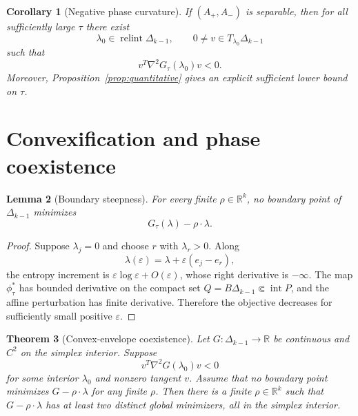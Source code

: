 \documentclass[11pt]{article}
\theoremstyle{plain}
\newtheorem{theorem}{Theorem}[section]
\newtheorem{lemma}[theorem]{Lemma}
\newtheorem{corollary}[theorem]{Corollary}
\theoremstyle{definition}
\theoremstyle{remark}
\newcommand{\R}{\mathbb R}
\newcommand{\relint}{\operatorname{relint}}
\newcommand{\DeltaK}{\Delta_{k-1}}
\begin{document}
\begin{corollary}[Negative phase curvature]\label{cor:negative-curvature}
If $(A_+,A_-)$ is separable, then for all sufficiently large $\tau$ there exist
\[
 \lambda_0\in\relint\DeltaK,
 \qquad
 0\ne v\in T_{\lambda_0}\DeltaK
\]
such that
\[
 v^T\nabla^2G_\tau(\lambda_0)v<0.
\]
Moreover, Proposition~\ref{prop:quantitative} gives an explicit sufficient lower bound on $\tau$.
\end{corollary}

\section{Convexification and phase coexistence}

\begin{lemma}[Boundary steepness]\label{lem:boundary}
For every finite $\rho\in\R^k$, no boundary point of $\DeltaK$ minimizes
\[
 G_\tau(\lambda)-\rho\cdot\lambda.
\]
\end{lemma}

\begin{proof}
Suppose $\lambda_j=0$ and choose $r$ with $\lambda_r>0$. Along
\[
 \lambda(\varepsilon)=\lambda+\varepsilon(e_j-e_r),
\]
the entropy increment is $\varepsilon\log\varepsilon+O(\varepsilon)$, whose right derivative is $-\infty$. The map $\phi_\tau^*$ has bounded derivative on the compact set $Q=B\DeltaK\Subset\operatorname{int}P$, and the affine perturbation has finite derivative. Therefore the objective decreases for sufficiently small positive $\varepsilon$.
\end{proof}

\begin{theorem}[Convex-envelope coexistence]\label{thm:coexistence}
Let $G:\DeltaK\to\R$ be continuous and $C^2$ on the simplex interior. Suppose
\[
 v^T\nabla^2G(\lambda_0)v<0
\]
for some interior $\lambda_0$ and nonzero tangent $v$. Assume that no boundary point minimizes $G-\rho\cdot\lambda$ for any finite $\rho$. Then there is a finite $\rho\in\R^k$ such that $G-\rho\cdot\lambda$ has at least two distinct global minimizers, all in the simplex interior.
\end{theorem}
\end{document}
